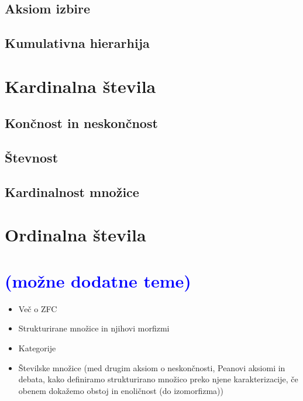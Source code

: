 \documentclass[11pt,a4paper,twoside]{book}
\newcommand{\note}[1]{{\small\textcolor{blue}{(#1)}}}
\begin{document}
		\section{Aksiom izbire}
		\section{Kumulativna hierarhija}
	
	\chapter{Kardinalna števila}
		\section{Končnost in neskončnost}
		\section{Števnost}
		\section{Kardinalnost množice}
	
	\chapter{Ordinalna števila}
	
	\chapter{\note{možne dodatne teme}}
		\begin{itemize}
			\item
				Več o ZFC
			\item
				Strukturirane množice in njihovi morfizmi
			\item
				Kategorije
			\item
				Številske množice (med drugim aksiom o neskončnosti, Peanovi aksiomi in debata, kako definiramo strukturirano množico preko njene karakterizacije, če obenem dokažemo obstoj in enoličnost (do izomorfizma))
		\end{itemize}
	
	
\end{document}

